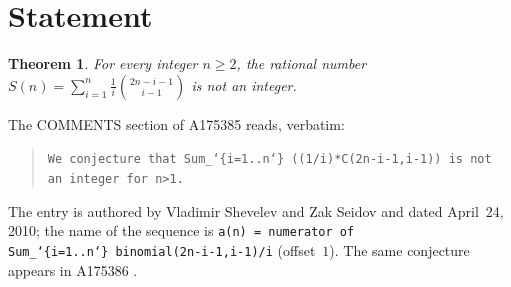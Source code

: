 \documentclass[11pt]{amsart}
\theoremstyle{plain}
\newtheorem{theorem}{Theorem}
\theoremstyle{definition}
\begin{document}
\section{Statement}\label{sec:statement}

\begin{theorem}\label{thm:main}
For every integer $n\ge2$, the rational number $S(n)=\sum_{i=1}^{n}\frac{1}{i}\binom{2n-i-1}{i-1}$ is not an integer.
\end{theorem}

The COMMENTS section of A175385 \cite{A175385} reads, verbatim:
\begin{quote}
\raggedright\texttt{We conjecture that Sum\_\char`\{i=1..n\char`\}\ ((1/i)*C(2n-i-1,i-1)) is not an integer for n>1.}
\end{quote}
The entry is authored by Vladimir Shevelev and Zak Seidov and dated April~24, 2010; the name of the sequence is \texttt{a(n) = numerator of Sum\_\char`\{i=1..n\char`\}\ binomial(2n-i-1,i-1)/i} (offset~$1$).
The same conjecture appears in A175386 \cite{A175386}.
\end{document}
